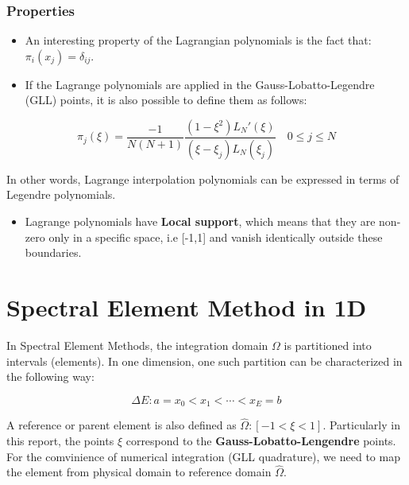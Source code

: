 \documentclass[
  a4paper,
  10pt]{article}
\providecommand{\tightlist}{%
  \setlength{\itemsep}{0pt}\setlength{\parskip}{0pt}}
\begin{document}
\hypertarget{properties-1}{%
\subsubsection{Properties}\label{properties-1}}

\begin{itemize}
\item
  An interesting property of the Lagrangian polynomials is the fact
  that: \(\pi_i(x_j)=\delta_{ij}\).
\item
  If the Lagrange polynomials are applied in the Gauss-Lobatto-Legendre (GLL) points, it is also
  possible to define them as follows:
\end{itemize}

\begin{equation}
    \pi_j(\xi) = \frac{-1}{N(N+1)} \frac{(1-{\xi}^2)L_N'(\xi)}{(\xi-\xi_j)L_N(\xi_j)}  \quad 0 \leq j \leq N 
\end{equation}

In other words, Lagrange interpolation polynomials can be expressed in
terms of Legendre polynomials.

\begin{itemize}
\tightlist
\item
  Lagrange polynomials have \textbf{Local support}, which means that they
  are non-zero only in a specific space, i.e {[}-1,1{]} and vanish
  identically outside these boundaries.
\end{itemize}

\hypertarget{spectral-element-method-in-1d}{%
\section{Spectral Element Method in
1D}\label{spectral-element-method-in-1d}}

In Spectral Element Methods, the integration domain \(\Omega\) is
partitioned into intervals (elements). In one dimension, one such
partition can be characterized in the following way:

\begin{equation}
    \Delta{E} : a=x_0<x_1< \cdots < x_E =b
\end{equation}

A reference or parent element is also defined as
\(\hat{\Omega}:[-1 < \xi < 1]\). Particularly in this report, the points
\(\xi\) correspond to the \textbf{Gauss-Lobatto-Lengendre} points. For
the comvinience of numerical integration (GLL quadrature), we need to
map the element from physical domain to reference domain
\(\hat{\Omega}\).
\end{document}
